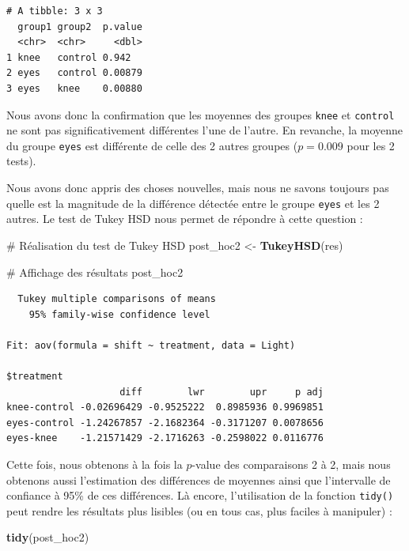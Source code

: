 \documentclass[
  a4paper,
]{article}
\newenvironment{Shaded}{\begin{snugshade}}{\end{snugshade}}
\newcommand{\CommentTok}[1]{\textcolor[rgb]{0.54,0.53,0.53}{#1}}
\newcommand{\KeywordTok}[1]{\textcolor[rgb]{0.12,0.11,0.11}{\textbf{#1}}}
\newcommand{\NormalTok}[1]{\textcolor[rgb]{0.12,0.11,0.11}{#1}}
\newcommand{\StringTok}[1]{\textcolor[rgb]{0.75,0.01,0.01}{#1}}
\begin{document}
\begin{verbatim}
# A tibble: 3 x 3
  group1 group2  p.value
  <chr>  <chr>     <dbl>
1 knee   control 0.942  
2 eyes   control 0.00879
3 eyes   knee    0.00880
\end{verbatim}

Nous avons donc la confirmation que les moyennes des groupes \texttt{knee} et \texttt{control} ne sont pas significativement différentes l'une de l'autre. En revanche, la moyenne du groupe \texttt{eyes} est différente de celle des 2 autres groupes (\(p = 0.009\) pour les 2 tests).

Nous avons donc appris des choses nouvelles, mais nous ne savons toujours pas quelle est la magnitude de la différence détectée entre le groupe \texttt{eyes} et les 2 autres. Le test de Tukey HSD nous permet de répondre à cette question :

\begin{Shaded}
\begin{Highlighting}[]
\CommentTok{# Réalisation du test de Tukey HSD}
\NormalTok{post_hoc2 <-}\StringTok{ }\KeywordTok{TukeyHSD}\NormalTok{(res)}

\CommentTok{# Affichage des résultats}
\NormalTok{post_hoc2}
\end{Highlighting}
\end{Shaded}

\begin{verbatim}
  Tukey multiple comparisons of means
    95% family-wise confidence level

Fit: aov(formula = shift ~ treatment, data = Light)

$treatment
                    diff        lwr        upr     p adj
knee-control -0.02696429 -0.9525222  0.8985936 0.9969851
eyes-control -1.24267857 -2.1682364 -0.3171207 0.0078656
eyes-knee    -1.21571429 -2.1716263 -0.2598022 0.0116776
\end{verbatim}

Cette fois, nous obtenons à la fois la \(p\)-value des comparaisons 2 à 2, mais nous obtenons aussi l'estimation des différences de moyennes ainsi que l'intervalle de confiance à 95\% de ces différences. Là encore, l'utilisation de la fonction \texttt{tidy()} peut rendre les résultats plus lisibles (ou en tous cas, plus faciles à manipuler) :

\begin{Shaded}
\begin{Highlighting}[]
\KeywordTok{tidy}\NormalTok{(post_hoc2)}
\end{Highlighting}
\end{Shaded}
\end{document}
